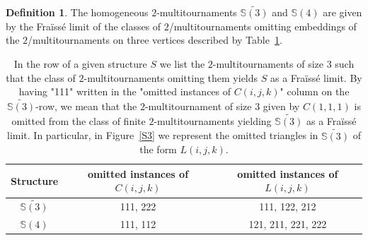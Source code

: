 \documentclass{article}
\theoremstyle{remark}
\theoremstyle{definition}
\newtheorem{definition}[theorem]{Definition}
\begin{document}
\begin{definition}
    The homogeneous $2$-multitournaments $\widetilde{\mathbb{S}(3)}$ and $\mathbb{S}(4)$ are given by the Fra\"{i}ss\'e limit of the classes of $2$\-/multitournaments omitting embeddings of the $2$\-/multitournaments on three vertices described by Table~\ref{S3S4}.



\setlength{\tabcolsep}{18pt}
\renewcommand{\arraystretch}{2}
\begin{table}
    \begin{center}
\begin{tabular}{|c ||c | c||} 
 \hline
 \textbf{Structure} & omitted instances of $C(i,j,k)$ & omitted instances of $L(i,j,k)$\\  
 \hline \hline 
 $\widetilde{\mathbb{S}(3)}$ & 111, 222 & 111, 122, 212 \\
 \hline
 $\mathbb{S}(4)$ & 111, 112 & 121, 211, 221, 222 \\
  \hline

\end{tabular}
\end{center}
  \caption{In the row of a given structure $S$ we list the $2$-multitournaments of size $3$ such that the class of $2$-multitournaments omitting them yields $S$ as a Fra\"{i}ss\'{e} limit. By having "111" written in the "omitted instances of $C(i,j,k)$" column on the $\widetilde{\mathbb{S}(3)}$-row, we mean that the $2$-multitournament of size $3$ given by $C(1,1,1)$ is omitted from the class of finite $2$-multitournaments yielding $\widetilde{\mathbb{S}(3)}$ as a Fra\"{i}ss\'{e} limit. In particular, in Figure~\ref{S3} we represent the omitted triangles in $\widetilde{\mathbb{S}(3)}$ of the form $L(i,j,k)$.}
  \label{S3S4}
\end{table}

\end{definition}
\end{document}
